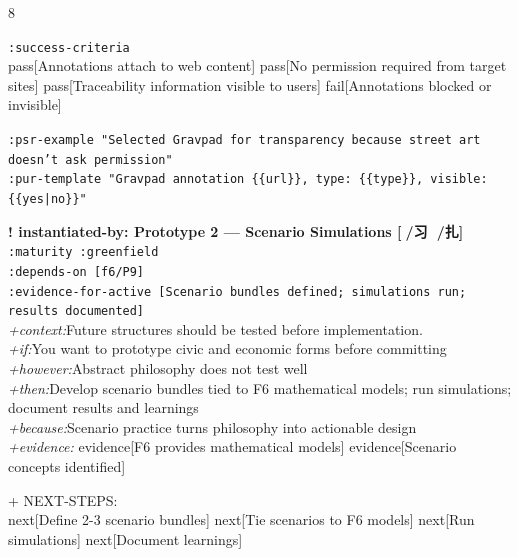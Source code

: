 \documentclass[landscape]{article}
\newcommand{\flexitag}[1]{\textcolor[gray]{0.35}{\textit{#1}}}
\newenvironment{devmapgreenfield}{%
  \def\FrameCommand{\colorbox{devmapgreenfieldbg}}%
  \setlength{\fboxsep}{2pt}%
  \MakeFramed{\advance\hsize-\width \FrameRestore}%
}{\endMakeFramed}
\begin{document}
\begin{paracol}{8}
\begin{devmapgreenfield}
\par
  \texttt{:\allowbreak{}success-\allowbreak{}criteria}\\
    pass[Annotations attach to web content] pass[No permission required from target sites] pass[Traceability information visible to users] fail[Annotations blocked or invisible]\\
\par
  \texttt{:\allowbreak{}psr-\allowbreak{}example "Selected Gravpad for transparency because street art doesn't ask permission"}\\
  \texttt{:\allowbreak{}pur-\allowbreak{}template "Gravpad annotation \{\{url\}\},\allowbreak{} type:\allowbreak{} \{\{type\}\},\allowbreak{} visible:\allowbreak{} \{\{yes|\allowbreak{}no\}\}"}\\
\par
\par
\end{devmapgreenfield}
\begin{devmapgreenfield}
\textbf{! instantiated-by: Prototype 2 — Scenario Simulations [🚞/习 🔸/扎]}\\
  \texttt{:\allowbreak{}maturity :\allowbreak{}greenfield}\\
  \texttt{:\allowbreak{}depends-\allowbreak{}on [f6/\allowbreak{}P9]}\\
  \texttt{:\allowbreak{}evidence-\allowbreak{}for-\allowbreak{}active [Scenario bundles defined;\allowbreak{} simulations run;\allowbreak{} results documented]}\\
  \flexitag{+context:}Future structures should be tested before implementation.\\
  \flexitag{+if:}You want to prototype civic and economic forms before committing\\
  \flexitag{+however:}Abstract philosophy does not test well\\
  \flexitag{+then:}Develop scenario bundles tied to F6 mathematical models; run simulations; document results and learnings\\
  \flexitag{+because:}Scenario practice turns philosophy into actionable design\\
  \flexitag{+evidence:} evidence[F6 provides mathematical models] evidence[Scenario concepts identified]\\
\par
  + NEXT-STEPS:\\
    next[Define 2-3 scenario bundles] next[Tie scenarios to F6 models] next[Run simulations] next[Document learnings]\\

\end{devmapgreenfield}
\end{paracol}
\end{document}
